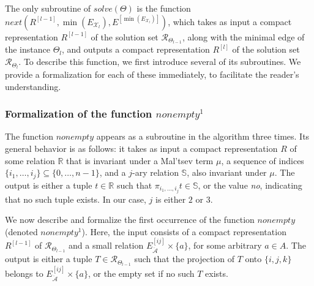 \documentclass{article}
\renewcommand{\S}{\mathbb{S}}
\theoremstyle{definition}
\theoremstyle{theorem}
\theoremstyle{theorem}
\theoremstyle{remark}
\theoremstyle{remark}
\theoremstyle{example}
\theoremstyle{notation}
\theoremstyle{theorem}
\begin{document}
The only subroutine of $solve(\Theta)$ is the function $next(R^{[l-1]}, \min(E_{\mathcal{X}_l}), E^{[\min(E_{\mathcal{X}_l})]})$, which takes as input a compact representation $R^{[l-1]}$ of the solution set $\mathscr{R}_{\Theta_{l-1}}$, along with the minimal edge of the instance $\Theta_l$, and outputs a compact representation $R^{[l]}$ of the solution set $\mathscr{R}_{\Theta_l}$. To describe this function, we first introduce several of its subroutines. We provide a formalization for each of these immediately, to facilitate the reader's understanding.


\subsubsection{Formalization of the function $nonempty^1$}
The function $nonempty$ appears as a subroutine in the algorithm three times. Its general behavior is as follows: it takes as input a compact representation $R$ of some relation $\mathbb{R}$ that is invariant under a Mal'tsev term $\mu$, a sequence of indices $\{i_1, \ldots, i_j\} \subseteq \{0, \ldots, n-1\}$, and a $j$-ary relation $\S$, also invariant under $\mu$. The output is either a tuple $t \in \mathbb{R}$ such that $\pi_{i_1, \ldots, i_j}t \in \S$, or the value \emph{no}, indicating that no such tuple exists. In our case, $j$ is either $2$ or $3$.

We now describe and formalize the first occurrence of the function $nonempty$ (denoted $nonempty^1$). Here, the input consists of a compact representation $R^{[l-1]}$ of $\mathscr{R}_{\Theta_{l-1}}$ and a small relation $E^{[ij]}_{\ddot{\mathcal{A}}} \times \{a\}$, for some arbitrary $a \in A$. The output is either a tuple $T \in \mathscr{R}_{\Theta_{l-1}}$ such that the projection of $T$ onto $\{i,j,k\}$ belongs to $E^{[ij]}_{\ddot{\mathcal{A}}} \times \{a\}$, or the empty set if no such $T$ exists.
\end{document}
